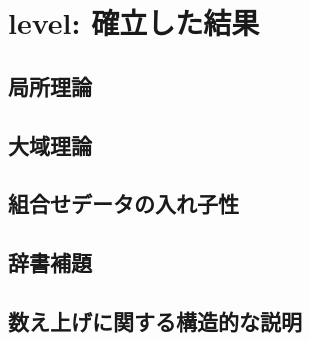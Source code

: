 
\section{level: 確立した結果}

\subsection{局所理論}

\subsection{大域理論}

\subsection{組合せデータの入れ子性}

\subsection{辞書補題}

\subsection{数え上げに関する構造的な説明}
